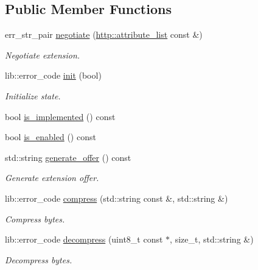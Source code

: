 \subsection*{Public Member Functions}
\begin{DoxyCompactItemize}
\item 
err\+\_\+str\+\_\+pair \mbox{\hyperlink{classwebsocketpp_1_1extensions_1_1permessage__deflate_1_1disabled_a3de3aad5ffeef60e3713cc29dec7b140}{negotiate}} (\mbox{\hyperlink{namespacewebsocketpp_1_1http_a9744f4104772b987aa9e86c35ce1357b}{http\+::attribute\+\_\+list}} const \&)
\begin{DoxyCompactList}\small\item\em Negotiate extension. \end{DoxyCompactList}\item 
lib\+::error\+\_\+code \mbox{\hyperlink{classwebsocketpp_1_1extensions_1_1permessage__deflate_1_1disabled_afe11662b31612191d72558fa7db5c114}{init}} (bool)
\begin{DoxyCompactList}\small\item\em Initialize state. \end{DoxyCompactList}\item 
bool \mbox{\hyperlink{classwebsocketpp_1_1extensions_1_1permessage__deflate_1_1disabled_a2471ea045dfff17b36effd61319fc87a}{is\+\_\+implemented}} () const
\item 
bool \mbox{\hyperlink{classwebsocketpp_1_1extensions_1_1permessage__deflate_1_1disabled_a821b1f5929e8330e24e792e0d3ac98a9}{is\+\_\+enabled}} () const
\item 
std\+::string \mbox{\hyperlink{classwebsocketpp_1_1extensions_1_1permessage__deflate_1_1disabled_a9ae74e6614ee441b535df1c729312817}{generate\+\_\+offer}} () const
\begin{DoxyCompactList}\small\item\em Generate extension offer. \end{DoxyCompactList}\item 
lib\+::error\+\_\+code \mbox{\hyperlink{classwebsocketpp_1_1extensions_1_1permessage__deflate_1_1disabled_a3ef2c3020ea3b8d531d3cee03bf8eadf}{compress}} (std\+::string const \&, std\+::string \&)
\begin{DoxyCompactList}\small\item\em Compress bytes. \end{DoxyCompactList}\item 
lib\+::error\+\_\+code \mbox{\hyperlink{classwebsocketpp_1_1extensions_1_1permessage__deflate_1_1disabled_ad72b694d8ce4c7e39c055ee2008810b6}{decompress}} (uint8\+\_\+t const $\ast$, size\+\_\+t, std\+::string \&)
\begin{DoxyCompactList}\small\item\em Decompress bytes. \end{DoxyCompactList}\end{DoxyCompactItemize}


